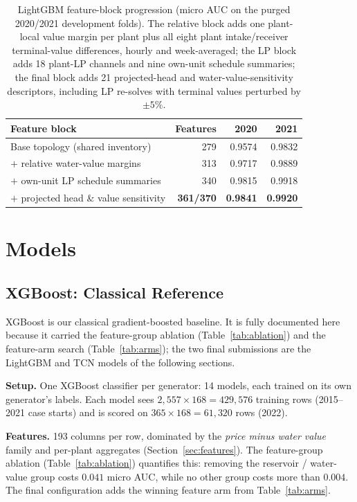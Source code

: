 \documentclass{article}
\begin{document}
\begin{table}[h]
    \centering
    \begin{tabular}{lrrr}
        \hline
        Feature block & Features & 2020 & 2021 \\
        \hline
        Base topology (shared inventory) & 279 & 0.9574 & 0.9832 \\
        $+$ relative water-value margins & 313 & 0.9717 & 0.9889 \\
        $+$ own-unit LP schedule summaries & 340 & 0.9815 & 0.9918 \\
        $+$ projected head \& value sensitivity & \textbf{361/370} & \textbf{0.9841} & \textbf{0.9920} \\
        \hline
    \end{tabular}
    \caption{LightGBM feature-block progression (micro AUC on the purged
    2020/2021 development folds). The relative block adds one
    plant-local value margin per plant plus all eight plant
    intake/receiver terminal-value differences, hourly and
    week-averaged; the LP block adds 18 plant-LP channels and nine
    own-unit schedule summaries; the final block adds 21 projected-head
    and water-value-sensitivity descriptors, including LP re-solves with
    terminal values perturbed by $\pm5\%$.}
    \label{tab:lgbmfeatures}
\end{table}

\section{Models}

\subsection{XGBoost: Classical Reference}
\label{sec:xgboost}

XGBoost is our classical gradient-boosted baseline. It is fully documented
here because it carried the feature-group ablation
(Table~\ref{tab:ablation}) and the feature-arm search
(Table~\ref{tab:arms}); the two final submissions are the LightGBM and
TCN models of the following sections.

\textbf{Setup.} One XGBoost classifier per generator: 14 models, each
trained on its own generator's labels. Each model sees
$2{,}557 \times 168 = 429{,}576$ training rows (2015--2021 case starts)
and is scored on $365 \times 168 = 61{,}320$ rows (2022).

\textbf{Features.} 193 columns per row, dominated by the \emph{price
minus water value} family and per-plant aggregates
(Section~\ref{sec:features}). The feature-group ablation
(Table~\ref{tab:ablation}) quantifies this: removing the reservoir /
water-value group costs $0.041$ micro AUC, while no other group costs
more than $0.004$. The final configuration adds the winning feature arm
from Table~\ref{tab:arms}.
\end{document}
